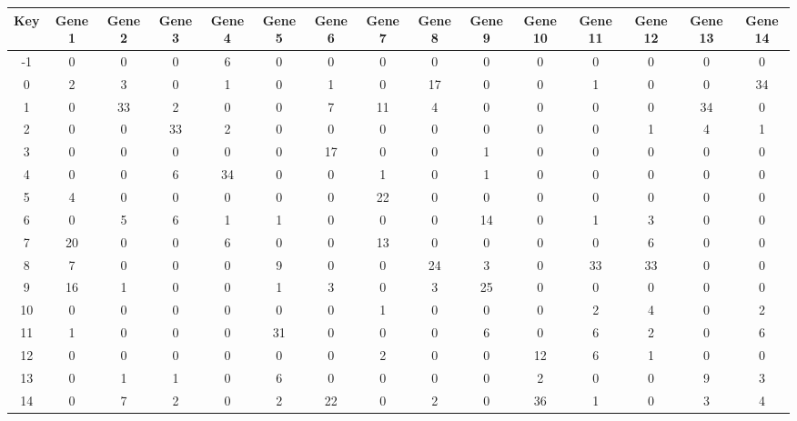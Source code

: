 \begin{tabular}{|c|c|c|c|c|c|c|c|c|c|c|c|c|c|c|}
\hline
Key & Gene 1 & Gene 2 & Gene 3 & Gene 4 & Gene 5 & Gene 6 & Gene 7 & Gene 8 & Gene 9 & Gene 10 & Gene 11 & Gene 12 & Gene 13 & Gene 14 \\
\hline
-1 & 0 & 0 & 0 & 6 & 0 & 0 & 0 & 0 & 0 & 0 & 0 & 0 & 0 & 0 \\
0 & 2 & 3 & 0 & 1 & 0 & 1 & 0 & 17 & 0 & 0 & 1 & 0 & 0 & 34 \\
1 & 0 & 33 & 2 & 0 & 0 & 7 & 11 & 4 & 0 & 0 & 0 & 0 & 34 & 0 \\
2 & 0 & 0 & 33 & 2 & 0 & 0 & 0 & 0 & 0 & 0 & 0 & 1 & 4 & 1 \\
3 & 0 & 0 & 0 & 0 & 0 & 17 & 0 & 0 & 1 & 0 & 0 & 0 & 0 & 0 \\
4 & 0 & 0 & 6 & 34 & 0 & 0 & 1 & 0 & 1 & 0 & 0 & 0 & 0 & 0 \\
5 & 4 & 0 & 0 & 0 & 0 & 0 & 22 & 0 & 0 & 0 & 0 & 0 & 0 & 0 \\
6 & 0 & 5 & 6 & 1 & 1 & 0 & 0 & 0 & 14 & 0 & 1 & 3 & 0 & 0 \\
7 & 20 & 0 & 0 & 6 & 0 & 0 & 13 & 0 & 0 & 0 & 0 & 6 & 0 & 0 \\
8 & 7 & 0 & 0 & 0 & 9 & 0 & 0 & 24 & 3 & 0 & 33 & 33 & 0 & 0 \\
9 & 16 & 1 & 0 & 0 & 1 & 3 & 0 & 3 & 25 & 0 & 0 & 0 & 0 & 0 \\
10 & 0 & 0 & 0 & 0 & 0 & 0 & 1 & 0 & 0 & 0 & 2 & 4 & 0 & 2 \\
11 & 1 & 0 & 0 & 0 & 31 & 0 & 0 & 0 & 6 & 0 & 6 & 2 & 0 & 6 \\
12 & 0 & 0 & 0 & 0 & 0 & 0 & 2 & 0 & 0 & 12 & 6 & 1 & 0 & 0 \\
13 & 0 & 1 & 1 & 0 & 6 & 0 & 0 & 0 & 0 & 2 & 0 & 0 & 9 & 3 \\
14 & 0 & 7 & 2 & 0 & 2 & 22 & 0 & 2 & 0 & 36 & 1 & 0 & 3 & 4 \\
\hline
\end{tabular}